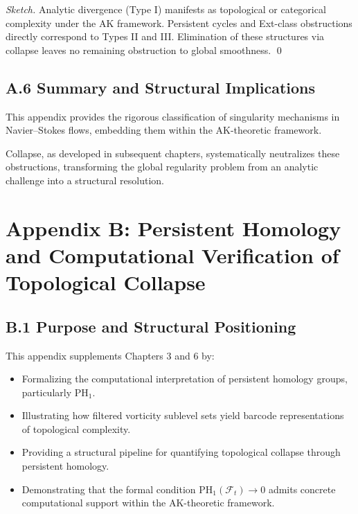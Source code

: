 \documentclass[11pt]{article}
\begin{document}
\begin{proof}[Sketch]
Analytic divergence (Type I) manifests as topological or categorical complexity under the AK framework. Persistent cycles and Ext-class obstructions directly correspond to Types II and III. Elimination of these structures via collapse leaves no remaining obstruction to global smoothness.
\hfill \qed
\end{proof}

\subsection*{A.6 Summary and Structural Implications}

This appendix provides the rigorous classification of singularity mechanisms in Navier–Stokes flows, embedding them within the AK-theoretic framework.

Collapse, as developed in subsequent chapters, systematically neutralizes these obstructions, transforming the global regularity problem from an analytic challenge into a structural resolution.



\section*{Appendix B: Persistent Homology and Computational Verification of Topological Collapse}

\subsection*{B.1 Purpose and Structural Positioning}

This appendix supplements Chapters 3 and 6 by:

\begin{itemize}
  \item Formalizing the computational interpretation of persistent homology groups, particularly \( \mathrm{PH}_1 \).
  \item Illustrating how filtered vorticity sublevel sets yield barcode representations of topological complexity.
  \item Providing a structural pipeline for quantifying topological collapse through persistent homology.
  \item Demonstrating that the formal condition \( \mathrm{PH}_1(\mathcal{F}_t) \to 0 \) admits concrete computational support within the AK-theoretic framework.
\end{itemize}
\end{document}
